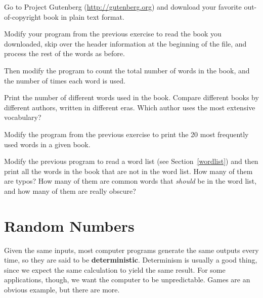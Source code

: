 \begin{exercise}

Go to Project Gutenberg (\url{http://gutenberg.org}) and download 
your favorite out-of-copyright book in plain text format.

Modify your program from the previous exercise to read the book
you downloaded, skip over the header information at the beginning
of the file, and process the rest of the words as before.

Then modify the program to count the total number of words in
the book, and the number of times each word is used.

Print the number of different words used in the book.  Compare
different books by different authors, written in different eras.
Which author uses the most extensive vocabulary?
\end{exercise}


\begin{exercise}

Modify the program from the previous exercise to print the
20 most frequently used words in a given book.

\end{exercise}


\begin{exercise}

Modify the previous program to read a word list (see
Section~\ref{wordlist}) and then print all the words in the book that
are not in the word list.  How many of them are typos?  How many of
them are common words that {\em should} be in the word list, and how
many of them are really obscure?

\end{exercise}


\section{Random Numbers}

Given the same inputs, most computer programs generate the same
outputs every time, so they are said to be {\bf deterministic}.
Determinism is usually a good thing, since we expect the same
calculation to yield the same result.  For some applications, though,
we want the computer to be unpredictable.  Games are an obvious
example, but there are more.

